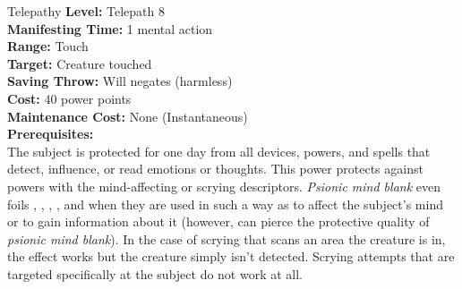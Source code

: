 {Telepathy}
{
	\textbf{Level:}
	Telepath 8\\
	\textbf{Manifesting Time:}
	1 mental action\\
	\textbf{Range:}
	Touch\\
	\textbf{Target:}
	Creature touched\\
	\textbf{Saving Throw:}
	Will negates (harmless)\\
	\textbf{Cost:}
	40 power points\\
	\textbf{Maintenance Cost:}
	None (Instantaneous)\\
	\textbf{Prerequisites:}
	\\
}
{
	The subject is protected for one day from all devices, powers, and spells that detect, influence, or read emotions or thoughts. This power protects against powers with the mind-affecting or scrying descriptors. \emph{Psionic mind blank} even foils , , , , and  when they are used in such a way as to affect the subject's mind or to gain information about it (however,  can pierce the protective quality of \emph{psionic mind blank}). In the case of scrying that scans an area the creature is in, the effect works but the creature simply isn't detected. Scrying attempts that are targeted specifically at the subject do not work at all.
}